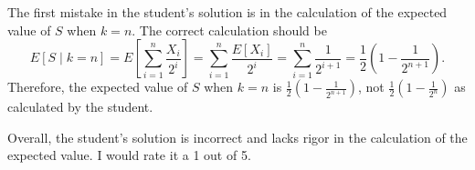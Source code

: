 The first mistake in the student's solution is in the calculation of the expected value of \( S \) when \( k = n \). The correct calculation should be
\[ E[S \mid k = n] = E\left[\sum_{i=1}^n \frac{X_i}{2^i} \right] = \sum_{i=1}^n \frac{E[X_i]}{2^i} = \sum_{i=1}^n \frac{1}{2^{i+1}} = \frac{1}{2} \left(1 - \frac{1}{2^{n+1}}\right). \]
Therefore, the expected value of \( S \) when \( k = n \) is \( \frac{1}{2} \left(1 - \frac{1}{2^{n+1}}\right) \), not \( \frac{1}{2} \left(1 - \frac{1}{2^{n}}\right) \) as calculated by the student.

Overall, the student's solution is incorrect and lacks rigor in the calculation of the expected value. I would rate it a 1 out of 5.
